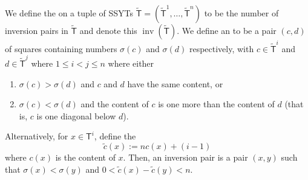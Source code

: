 \documentclass[11pt,leqno,oneside]{amsart}
\numberwithin{thm}{section}
\newcommand{\T}{\mathsf{T}} %
\newcommand{\inv}{\operatorname{inv}}
\begin{document}
\begin{defn}
  We define the  on a tuple
  of SSYTs
  \(\tilde{\T} = (\tilde{\T}^1, \ldots, \tilde{\T}^n)\) to be the number
  of inversion pairs in \(\tilde{\T}\) and denote this
  \(\inv(\tilde{\T})\). We define an  to be a pair
  \((c,d)\) of squares containing numbers \(\sigma(c)\) and
  \(\sigma(d)\) respectively, with \(c \in \tilde{\T}^i\) and \(d \in
  \tilde{\T}^j\) where \(1 \leq i < j \leq n\) where either
  \begin{enumerate}
  \item \(\sigma(c) > \sigma(d)\) and \(c\) and \(d\) have the same
    content, or
  \item \(\sigma(c) < \sigma(d)\) and the content of \(c\) is one more
    than the content of \(d\) (that is, \(c\) is one diagonal below \(d\)).
  \end{enumerate}
  Alternatively, for \(x \in \T^i\), define the  \[
    \tilde{c}(x) := nc(x) + (i-1) 
  \]
  where \(c(x)\) is the content of \(x\). Then, an inversion pair is a
  pair \((x,y)\) such that \(\sigma(x) < \sigma(y)\) and \(0 <
  \tilde{c}(x) - \tilde{c}(y) < n\).
\end{defn}
\end{document}
